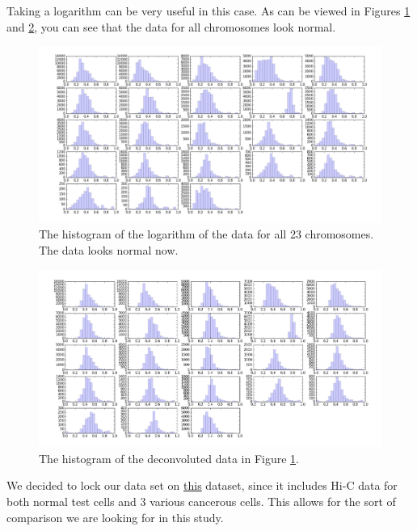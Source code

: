 \documentclass{article}
\begin{document}
Taking a logarithm can be very useful in this case. As can be viewed in Figures
\ref{fig:all_hists01} and \ref{fig:all_hists_deconvoluted01}, you can see that the data for 
all chromosomes look normal.
\begin{landscape}
\begin{figure}[H]
    \centering
    \includegraphics[width=1.5\textwidth]{figures/all_hists01.png}
    \caption{The histogram of the logarithm of the data for all 23
            chromosomes. The data looks normal now.}
    \label{fig:all_hists01}
\end{figure}

\begin{figure}[H]
    \centering
    \includegraphics[width=1.5\textwidth]{figures/all_hists_deconvoluted01.png}
    \caption{The histogram of the deconvoluted  data in Figure 
            \ref{fig:all_hists01}. }
    \label{fig:all_hists_deconvoluted01}
\end{figure}
\end{landscape}

We decided to lock our data set on \href{http://sysbio.rnet.missouri.edu/bdm_download}{this}
dataset, since it includes Hi-C data for both normal test cells and 3 various cancerous
cells. This allows for the sort of comparison we are looking for in this study.
\end{document}
